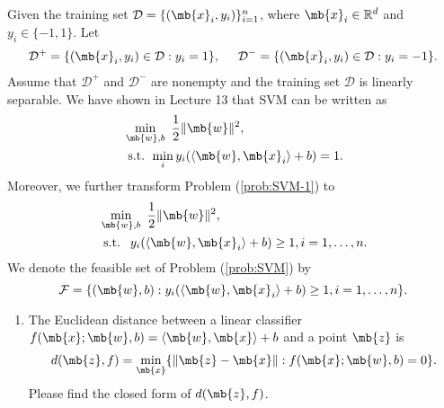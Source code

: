 \begin{exercise}
    Given the training set $\mathcal{D}=\{ (\mb{x}_i,y_i) \}_{i=1}^n$, where $\mb{x}_i \in \mathbb{R}^d$ and $y_i \in \{ -1,1 \}$. Let
    \begin{align*}
        \mathcal{D}^+=\{(\mb{x}_i,y_i)\in\mathcal{D}:y_i=1\},\hspace{5mm}\mathcal{D}^-=\{(\mb{x}_i,y_i)\in\mathcal{D}:y_i=-1\}.
    \end{align*}
    Assume that $\mathcal{D}^+$ and $\mathcal{D}^-$ are nonempty and the training set $\mathcal{D}$ is linearly separable. We have shown in Lecture 13 that SVM can be written as
    \begin{align}\label{prob:SVM-1}
        \begin{aligned}
             & \min_{\mb{w},b}\,\,\frac{1}{2}\| \mb{w} \|^2,                            \\
             & \text{ s.t. } \min_i y_{i} ( \langle \mb{w}, \mb{x}_i \rangle + b ) = 1.
        \end{aligned}
    \end{align}
    Moreover, we further transform Problem (\ref{prob:SVM-1}) to
    \begin{align}\label{prob:SVM}
        \begin{aligned}
             & \min_{\mb{w},b}\,\,\frac{1}{2}\| \mb{w} \|^2,                                          \\
             & \text{ s.t. }\,\, y_{i} ( \langle \mb{w}, \mb{x}_i \rangle + b ) \geq 1, i=1,\ldots,n.
        \end{aligned}
    \end{align}
    We denote the feasible set of Problem (\ref{prob:SVM}) by $$\mathcal{F}=\{(\mb{w},b):y_{i} ( \langle \mb{w}, \mb{x}_i \rangle + b ) \geq 1, i=1,\ldots,n\}.$$

    \begin{enumerate}
        \item The Euclidean distance between a linear classifier $f(\mb{x};\mb{w},b)=\langle\mb{w},\mb{x}\rangle+b$ and a point $\mb{z}$ is
            \begin{align*}
                d(\mb{z},f)=\min_{\mb{x}}\{\|\mb{z}-\mb{x} \|:f(\mb{x};\mb{w},b)=0\}.
            \end{align*}
            Please find the closed form of $d(\mb{z},f)$.


\end{enumerate}
\end{exercise}
